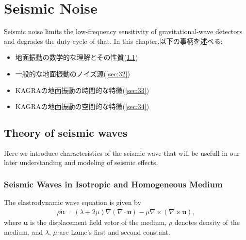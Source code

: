 \chapter{Seismic Noise}
Seismic noise limits the low-frequency sensitivity of gravitational-wave detectors and degrades the duty cycle of that. In this chapter,以下の事柄を述べる;
\begin{itemize}
\item 地面振動の数学的な理解とその性質(\cref{sec:31})
\item 一般的な地面振動のノイズ源(\cref{sec:32})
\item KAGRAの地面振動の時間的な特徴(\cref{sec:33})
\item KAGRAの地面振動の空間的な特徴(\cref{sec:34})
\end{itemize}


\section{Theory of seismic waves} \label{sec:31}
Here we introduce characteristics of the seismic wave that will be usefull in our later understanding and modeling of seismic effects.

\subsection{Seismic Waves in Isotropic and Homogeneous Medium}
The elastrodynamic wave equation is given by 
\begin{eqnarray}\label{eq:eq_1}
  \rho{\bm{\ddot{u}}} = (\lambda+2\mu)\nabla(\nabla\cdot\bm{u}) - \mu\nabla\times(\nabla\times\bm{u}),
\end{eqnarray}
where $\bm{u}$ is the displacement field vetor of the medium, $\rho$ denotes density of the medium, and $\lambda,\,\mu$ are Lame's first and second constant.


